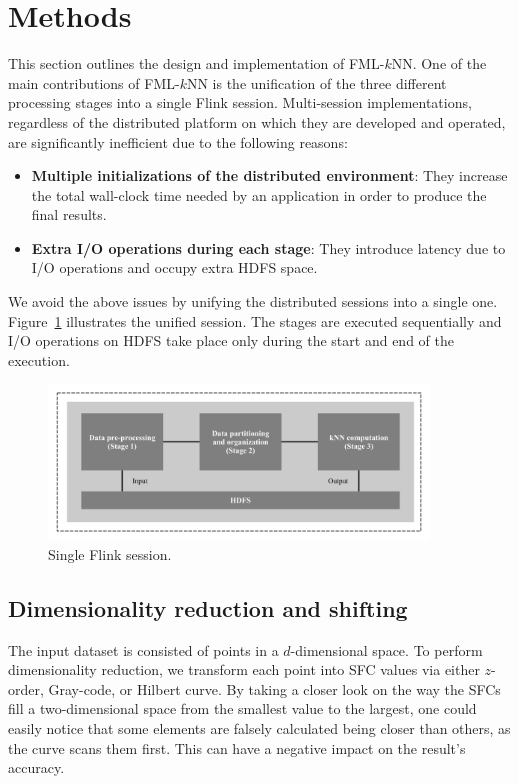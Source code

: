 
\section{Methods} 
\label{sec:knn_methods}

\graphicspath{{Papers/SpringerJournalOfBigData/}}

This section outlines the design and implementation of FML-$k$NN. One of the main contributions of FML-$k$NN is the unification of the three different processing stages into a single Flink session. Multi-session implementations, regardless of the distributed platform on which they are developed and operated, are significantly inefficient due to the following reasons:

\begin{itemize}
	\item \textbf{Multiple initializations of the distributed environment}: They increase the total wall-clock time needed by an application in order to produce the final results.
	\item \textbf{Extra I/O operations during each stage}: They introduce latency due to I/O operations and occupy extra HDFS space.
\end{itemize}

We avoid the above issues by unifying the distributed sessions into a single one. Figure~\ref{figure2} illustrates the unified session. The stages are executed sequentially and I/O operations on HDFS take place only during the start and end of the execution.

\begin{figure}[!ht]
	\centering
	\includegraphics[width=0.9\textwidth]{figures/figure2.png}
	\caption{Single Flink session.}
	\label{figure2}
\end{figure}

\subsection{Dimensionality reduction and shifting}
The input dataset is consisted of points in a $d$-dimensional space. To perform dimensionality reduction, we transform each point into SFC values via either $z$-order, Gray-code, or Hilbert curve. By taking a closer look on the way the SFCs fill a two-dimensional space from the smallest value to the largest, one could easily notice that some elements are falsely calculated being closer than others, as the curve scans them first. This can have a negative impact on the result’s accuracy. 

